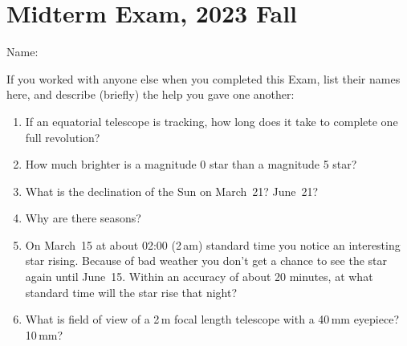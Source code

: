 \documentclass[12pt]{article}
\begin{document}
\section*{Midterm Exam, 2023 Fall}
\noindent
Name:
\vspace{0.5in}

\noindent
If you worked with anyone else when you completed this Exam, list their names
here, and describe (briefly) the help you gave one another:
\vspace{1in}

\begin{enumerate}
  \item If an equatorial telescope is tracking, how long does it take
    to complete one full revolution?
    \vspace{1.5in}
  \item How much brighter is a magnitude 0 star than a magnitude 5 star?
    \vspace{1.5in}
  \item What is the declination of the Sun on March~21? June~21?
    \vspace{1.5in}
\clearpage
  \item Why are there seasons?
    \vspace{1.5in}
  \item On March~15 at about 02:00 (2\,am) standard time you notice an
    interesting star rising. Because of bad weather you don’t get a
    chance to see the star again until June~15. Within an accuracy of
    about 20 minutes, at what standard time will the star rise that
    night?
    \vspace{1.5in}
  \item What is field of view of a 2\,m focal length telescope with a
    40\,mm eyepiece? 10\,mm?
    \vspace{1.5in}
\end{enumerate}
\end{document}
